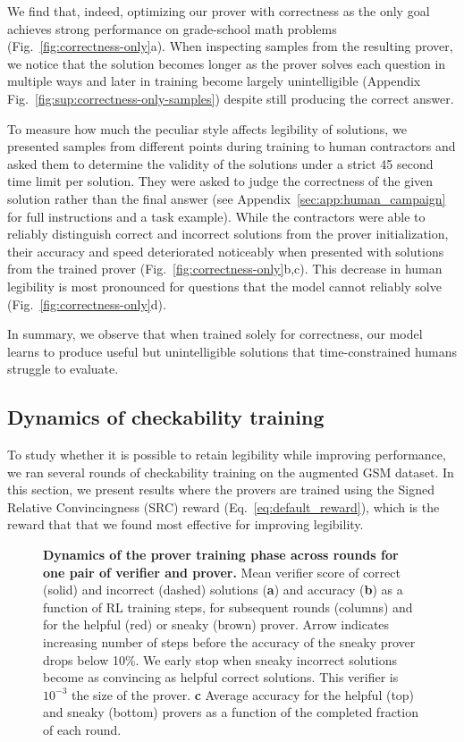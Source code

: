 \documentclass{article}
\begin{document}
We find that, indeed, optimizing our prover with correctness as the only goal achieves strong performance on grade-school math problems (Fig.~\ref{fig:correctness-only}a). When inspecting samples from the resulting prover, we notice that the solution becomes longer as the prover solves each question in multiple ways and later in training become largely unintelligible (Appendix Fig.~\ref{fig:sup:correctness-only-samples}) despite still producing the correct answer.

To measure how much the peculiar style affects legibility of solutions, we presented samples from different points during training to human contractors and asked them to determine the validity of the solutions under a strict 45 second time limit per solution. They were asked to judge the correctness of the given solution rather than the final answer (see Appendix~\ref{sec:app:human_campaign} for full instructions and a task example). While the contractors were able to reliably distinguish correct and incorrect solutions from the prover initialization, their accuracy and speed deteriorated noticeably when presented with solutions from the trained prover (Fig.~\ref{fig:correctness-only}b,c). This decrease in human legibility is most pronounced for questions that the model cannot reliably solve (Fig.~\ref{fig:correctness-only}d).


In summary, we observe that when trained solely for correctness, our model learns to produce useful but unintelligible solutions that time-constrained humans struggle to evaluate.


\subsection{Dynamics of checkability training}\label{sec:training-dynamics}

To study whether it is possible to retain legibility while improving performance, we ran several rounds of checkability training on the augmented GSM dataset. In this section, we present results where the provers are trained using the Signed Relative Convincingness (SRC) reward (Eq.~\eqref{eq:default_reward}), which is the reward that that we found most effective for improving legibility. 

\begin{figure}
    \centering
    \caption{\textbf{Dynamics of the prover training phase across rounds for one pair of verifier and prover.} Mean verifier score of correct (solid) and incorrect (dashed) solutions (\textbf{a}) and accuracy (\textbf{b}) as a function of RL training steps, for subsequent rounds (columns) and for the helpful (red) or sneaky (brown) prover. Arrow indicates increasing number of steps before the accuracy of the sneaky prover drops below 10\%. We early stop when sneaky incorrect solutions become as convincing as helpful correct solutions. This verifier is $10^{-3}$ the size of the prover. \textbf{c} Average accuracy for the helpful (top) and sneaky (bottom) provers as a function of the completed fraction of each round.}
    \label{fig:fig2}
\end{figure}
\end{document}
